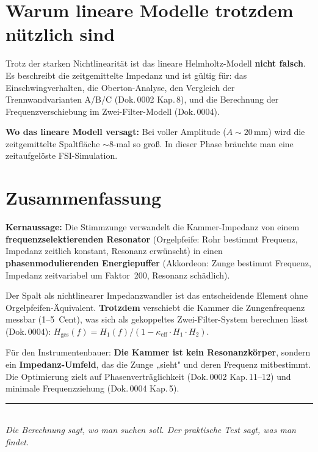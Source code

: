 \documentclass[11pt,a4paper]{article}
\begin{document}
\section{Warum lineare Modelle trotzdem nützlich sind}

Trotz der starken Nichtlinearität ist das lineare Helmholtz-Modell \textbf{nicht falsch}. Es beschreibt die zeitgemittelte Impedanz und ist gültig für: das Einschwingverhalten, die Oberton-Analyse, den Vergleich der Trennwandvarianten A/B/C (Dok.\,0002 Kap.\,8), und die Berechnung der Frequenzverschiebung im Zwei-Filter-Modell (Dok.\,0004).

\begin{warnbox}
\textbf{Wo das lineare Modell versagt:} Bei voller Amplitude ($A \sim 20$\,mm) wird die zeitgemittelte Spaltfläche $\sim$8-mal so groß. In dieser Phase bräuchte man eine zeitaufgelöste FSI-Simulation.
\end{warnbox}

\section{Zusammenfassung}

\begin{keybox}
\textbf{Kernaussage:} Die Stimmzunge verwandelt die Kammer-Impedanz von einem \textbf{frequenzselektierenden Resonator} (Orgelpfeife: Rohr bestimmt Frequenz, Impedanz zeitlich konstant, Resonanz erwünscht) in einen \textbf{phasenmodulierenden Energiepuffer} (Akkordeon: Zunge bestimmt Frequenz, Impedanz zeitvariabel um Faktor~200, Resonanz schädlich).

Der Spalt als nichtlinearer Impedanzwandler ist das entscheidende Element ohne Orgelpfeifen-Äquivalent. \textbf{Trotzdem} verschiebt die Kammer die Zungenfrequenz messbar (1--5~Cent), was sich als gekoppeltes Zwei-Filter-System berechnen lässt (Dok.\,0004): $H_\text{ges}(f) = H_1(f) / (1 - \kappa_\text{eff} \cdot H_1 \cdot H_2)$.

Für den Instrumentenbauer: \textbf{Die Kammer ist kein Resonanzkörper}, sondern ein \textbf{Impedanz-Umfeld}, das die Zunge „sieht" und deren Frequenz mitbestimmt. Die Optimierung zielt auf Phasenverträglichkeit (Dok.\,0002 Kap.\,11--12) und minimale Frequenzziehung (Dok.\,0004 Kap.\,5).
\end{keybox}

\vspace{3mm}
\begin{center}
\textcolor{accentred}{\rule{0.6\textwidth}{1pt}}\\[4pt]
{\small\itshape Die Berechnung sagt, wo man suchen soll. Der praktische Test sagt, was man findet.}
\end{center}
\end{document}
